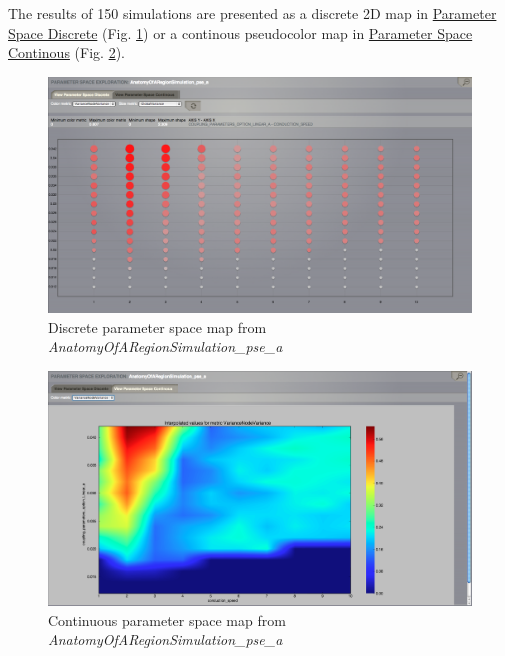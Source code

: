\documentclass{tufte-handout}
\begin{document}
The results of 150 simulations are presented as a discrete 2D map in \underline{Parameter Space Discrete} (Fig. \ref{fig:pse_discrete}) or a continous pseudocolor map in \underline{Parameter Space Continous} (Fig. \ref{fig:pse_continuous}). 


\begin{figure}[h]
  \includegraphics[width=\linewidth]{Handout_UI_BuildingYourOwnBrainNetworkModel_PSEDiscrete}%
  \caption{Discrete parameter space map from \textit{AnatomyOfARegionSimulation\_pse\_a}}%
  \label{fig:pse_discrete}%
\end{figure}

\begin{figure}[h]
  \includegraphics[width=\linewidth]{Handout_UI_BuildingYourOwnBrainNetworkModel_PSEContinuous}%
  \caption{Continuous parameter space map from \textit{AnatomyOfARegionSimulation\_pse\_a}}%
  \label{fig:pse_continuous}%
\end{figure}
\end{document}
